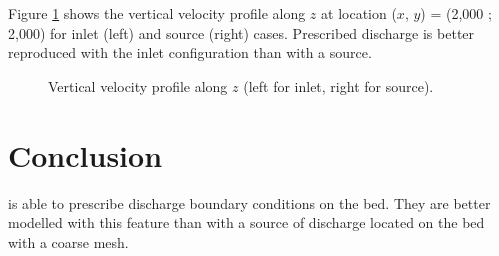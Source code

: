 Figure \ref{fig:bottom_bc:velocityW_profile} shows the vertical velocity profile
along $z$ at location ($x$, $y$) = (2,000 ; 2,000)
for inlet (left) and source (right) cases.
Prescribed discharge is better reproduced with the inlet configuration
than with a source.

\begin{figure}[H]
\centering
\begin{minipage}[t]{.45\textwidth}
 \centering
{}
\end{minipage}
\begin{minipage}[t]{.45\textwidth}
 \centering
{}
\end{minipage}
 \caption{Vertical velocity profile along $z$ (left for inlet, right for source).}
 \label{fig:bottom_bc:velocityW_profile}
\end{figure}

\section{Conclusion}

 is able to prescribe discharge boundary conditions on the bed.
They are better modelled with this feature than with a source of discharge
located on the bed with a coarse mesh.
